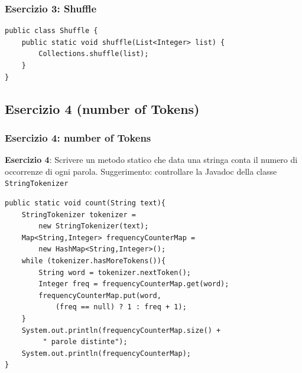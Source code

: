 \documentclass{beamer}
\begin{document}
\begin{frame}[fragile]
\frametitle{Esercizio 3: Shuffle}
\begin{framed}
\begin{lstlisting}
public class Shuffle {
    public static void shuffle(List<Integer> list) {
        Collections.shuffle(list);
    }
}
\end{lstlisting}
\end{framed}
\end{frame}

\subsection{Esercizio 4 (number of Tokens)}
\begin{frame}[fragile]
\frametitle{Esercizio 4: number of Tokens}
\begin{framed}
\textbf{Esercizio 4}: Scrivere un metodo statico che data una stringa conta il numero di occorrenze di ogni parola. Suggerimento: controllare la Javadoc della classe \texttt{StringTokenizer}
\end{framed}
\end{frame}

\begin{frame}[fragile]
\begin{framed}
\begin{lstlisting}
public static void count(String text){
    StringTokenizer tokenizer = 
        new StringTokenizer(text);
    Map<String,Integer> frequencyCounterMap = 
        new HashMap<String,Integer>();
    while (tokenizer.hasMoreTokens()){
        String word = tokenizer.nextToken();
        Integer freq = frequencyCounterMap.get(word);
        frequencyCounterMap.put(word,
            (freq == null) ? 1 : freq + 1);
    }
    System.out.println(frequencyCounterMap.size() +
         " parole distinte");
    System.out.println(frequencyCounterMap);
}
\end{lstlisting}
\end{framed}
\end{frame}




\end{document}
